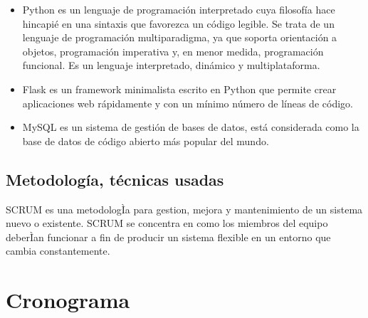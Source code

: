\documentclass[preprint,12pt]{elsarticle}
\begin{document}
\begin{itemize}
\item Python es un lenguaje de programación interpretado cuya filosofía hace hincapié en una sintaxis que favorezca un código legible. Se trata de un lenguaje de programación multiparadigma, ya que soporta orientación a objetos, programación imperativa y, en menor medida, programación funcional. Es un lenguaje interpretado, dinámico y multiplataforma.

\item Flask es un framework minimalista escrito en Python que permite crear aplicaciones web rápidamente y con un mínimo número de líneas de código.

\item MySQL es un sistema de gestión de bases de datos, está considerada como la base de datos de código abierto más popular del mundo.
\end{itemize}


\subsection{\textbf{Metodología, técnicas usadas}}

SCRUM es una metodologÌa para gestion, mejora y mantenimiento de un sistema nuevo o existente. SCRUM se concentra en como los miembros del equipo deberÌan funcionar a fin de producir un sistema flexible en un entorno que cambia constantemente. 




\section{Cronograma}
\end{document}
